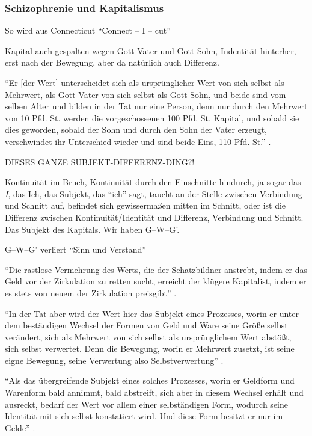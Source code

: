 \documentclass[12pt,
               DIV13,
               paper=a4,
               twoside=false,
               onehalfspacing,
               bibliography=totoc,
               toc=graduated,
               draft,
               ]{scrartcl}
\newcommand{\pc}[2]{\parencite[#1]{#2}}
\newcommand{\gwg}{G--W--G'\xspace}
\begin{document}
\subsubsection{Schizophrenie und Kapitalismus}

So wird aus Connecticut "`Connect -- I -- cut"' \pc{48}{ao}

Kapital auch gespalten wegen Gott-Vater und Gott-Sohn, Indentität
hinterher, erst nach der Bewegung, aber da natürlich auch Differenz.

"`Er [der Wert] unterscheidet sich als ursprünglicher Wert von sich
selbst als Mehrwert, als Gott Vater von sich selbst als Gott Sohn, und
beide sind vom selben Alter und bilden in der Tat nur eine Person,
denn nur durch den Mehrwert von 10 Pfd. St. werden die vorgeschossenen
100 Pfd. St. Kapital, und sobald sie dies geworden, sobald der Sohn
und durch den Sohn der Vater erzeugt, verschwindet ihr Unterschied
wieder und sind beide Eins, 110 Pfd. St."' \pc{S. 169 f.}{kap}.

DIESES GANZE SUBJEKT-DIFFERENZ-DING?!

Kontinuität im Bruch, Kontinuität durch den Einschnitte hindurch, ja
sogar das \emph{I}, das Ich, das Subjekt, das "`ich"' sagt, taucht an
der Stelle zwischen Verbindung und Schnitt auf, befindet sich
gewissermaßen mitten im Schnitt, oder ist die Differenz zwischen
Kontinuität/Identität und Differenz, Verbindung und Schnitt. Das
Subjekt des Kapitals. Wir haben \gwg.

\gwg verliert "`Sinn und Verstand"' \pc{166}{kap}

"`Die rastlose Vermehrung des Werts, die der Schatzbildner anstrebt,
indem er das Geld vor der Zirkulation zu retten sucht, erreicht der
klügere Kapitalist, indem er es stets von neuem der Zirkulation
preisgibt"' \pc{168}{kap}.

"`In der Tat aber wird der Wert hier das Subjekt eines Prozesses,
worin er unter dem beständigen Wechsel der Formen von Geld und Ware
seine Größe selbst verändert, sich als Mehrwert von sich selbst als
ursprünglichem Wert abstößt, sich selbst verwertet. Denn die Bewegung,
worin er Mehrwert zusetzt, ist seine eigne Bewegung, seine Verwertung
also Selbstverwertung"' \pc{169}{kap}.

"`Als das übergreifende Subjekt eines solches Prozesses, worin er
Geldform und Warenform bald annimmt, bald abstreift, sich aber in
diesem Wechsel erhält und ausreckt, bedarf der Wert vor allem einer
selbständigen Form, wodurch seine Identität mit sich selbst
konstatiert wird. Und diese Form besitzt er nur im Gelde"'
\pc{169}{kap}.
\end{document}
